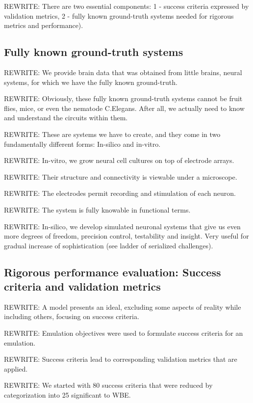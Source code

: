 \documentclass{ldr-article}
\begin{document}
\alert{REWRITE:} There are two essential components: 1 - success criteria expressed by validation metrics, 2 - fully known ground-truth systems needed for rigorous metrics and performance).

\subsection{Fully known ground-truth systems}

\alert{REWRITE:} We provide brain data that was obtained from little brains, neural systems, for which we have the fully known ground-truth.

\alert{REWRITE:} Obviously, these fully known ground-truth systems cannot be fruit flies, mice, or even the nematode C.Elegans. After all, we actually need to know and understand the circuits within them.

\alert{REWRITE:} These are systems we have to create, and they come in two fundamentally different forms: In-silico and in-vitro.

\alert{REWRITE:} In-vitro, we grow neural cell cultures on top of electrode arrays.

\alert{REWRITE:} Their structure and connectivity is viewable under a microscope.

\alert{REWRITE:} The electrodes permit recording and stimulation of each neuron.

\alert{REWRITE:} The system is fully knowable in functional terms.

\alert{REWRITE:} In-silico, we develop simulated neuronal systems that give us even more degrees of freedom, precision control, testability and insight. Very useful for gradual increase of sophistication (see ladder of serialized challenges).

\subsection{Rigorous performance evaluation: Success criteria and validation metrics}

\alert{REWRITE:} A model presents an ideal, excluding some aspects of reality while including others, focusing on success criteria.

\alert{REWRITE:} Emulation objectives were used to formulate success criteria for an emulation.

\alert{REWRITE:} Success criteria lead to corresponding validation metrics that are applied.

\alert{REWRITE:} We started with 80 success criteria that were reduced by categorization into 25 significant to WBE.
\end{document}
